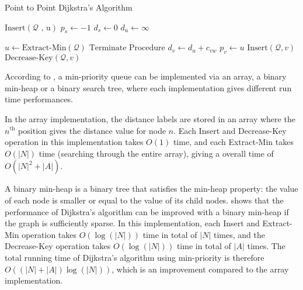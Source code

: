 \begin{algorithm}[!ht]
    \caption{Point to Point Dijkstra's Algorithm}
    \label{algo:p2pdijkstra}
    \begin{algorithmic}[1]
        \State $\text{Insert}(\mathcal{Q}\text{ , u})$ 
        \State $p_s \gets -1$ 
        \State $d_s \gets 0$
         
        \State $d_u \gets \infty$
    \EndFor

    \State $ u \gets \text{Extract-Min}(\mathcal{Q}) $ 
    \State $\text{Terminate Procedure}$ 
\EndIf
 
\State $d_v \gets d_u + c_{vw}$
\State $p_v \gets u$
\State $\text{Insert}(\mathcal{Q}, v)$ 
\Else
\State $\text{Decrease-Key}(\mathcal{Q}, v)$ 
    \EndIf
\EndIf
                \EndFor
            \EndIf
        \EndWhile
    \EndProcedure
\end{algorithmic}
\end{algorithm}

According to \citet{Cormen},
a min-priority queue can be implemented via an array, a binary min-heap or a binary search tree,
where each implementation gives different run time performances.

In the array implementation,
the distance labels are stored in an array where the $n^{\text{th}}$ position gives the distance value for node $n$.
Each Insert and Decrease-Key operation in this implementation takes $O(1)$ time, and each Extract-Min takes $O(|N|)$ time (searching through the entire array), giving a overall time of $O(|N|^2 + |A|)$.

A binary min-heap is a binary tree that satisfies the min-heap property:
the value of each node is smaller or equal to the value of its child nodes.
\citet{Cormen} shows that the performance of Dijkstra's algorithm can be improved with a binary min-heap if the graph is sufficiently sparse.
In this implementation, each Insert and Extract-Min operation takes $O(\log(|N|))$ time in total of $|N|$ times,
and the Decrease-Key operation takes $O(\log(|N|))$ time in total of $|A|$ times.
The total running time of Dijkstra's algorithm using min-priority is therefore $O((|N|+|A|)\log(|N|))$,
which is an improvement compared to the array implementation.

